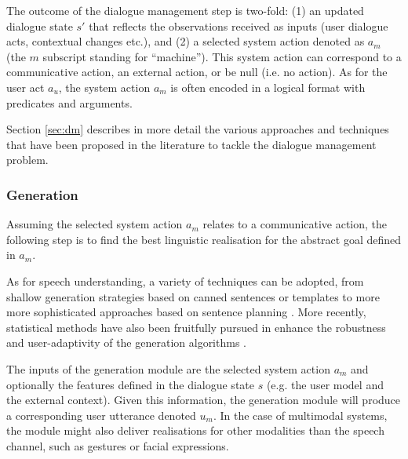 The outcome of the dialogue management step is two-fold: (1) an updated dialogue state $s'$ that reflects the observations received as inputs (user dialogue acts, contextual changes etc.), and (2) a selected system action denoted as $a_m$ (the $m$ subscript standing for ``machine'').  This system action can correspond to a communicative action, an external action, or be null (i.e. no action).  As for the user act $a_u$, the system action $a_m$ is often encoded in a logical format with predicates and arguments. 

Section \ref{sec:dm} describes in more detail the various approaches and techniques that have been proposed in the literature to tackle the dialogue management problem. 

\subsubsection*{Generation}
Assuming the selected system action $a_m$ relates to a communicative action, the following step is to find the best linguistic realisation for the abstract goal defined in $a_m$.  


As for speech understanding, a variety of techniques can be adopted, from shallow generation strategies based on canned sentences or templates to more more sophisticated approaches based on sentence planning \citep{Stone2003,koller-stone:2007}.  More recently, statistical methods have also been fruitfully pursued in enhance the robustness and user-adaptivity of the generation algorithms \citep{Rieser:2010,DethlefsC11}. 

The inputs of the generation module are the selected system action $a_m$ and optionally the features defined in the dialogue state $s$ (e.g. the user model and the external context). Given this information, the generation module will produce a corresponding user utterance denoted $u_m$.  In the case of multimodal systems, the module might also deliver realisations for other modalities than the speech channel, such as gestures or facial expressions.

